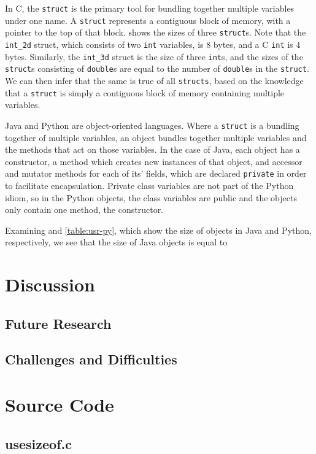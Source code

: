 \documentclass[12pt,letterpaper]{article}
\begin{document}
		In C, the \texttt{struct} is the primary tool for bundling together multiple variables under one name. A \texttt{struct} represents a contiguous block of memory, with a pointer to the top of that block.  shows the sizes of three \texttt{struct}s. Note that the \texttt{int_2d} struct, which consists of two \texttt{int} variables, is 8 bytes, and a C \texttt{int} is 4 bytes. Similarly, the \texttt{int_3d} struct is the size of three \texttt{int}s, and the sizes of the \texttt{struct}s consisting of \texttt{double}s are equal to the number of \texttt{double}s in the \texttt{struct}.  We can then infer that the same is true of all \texttt{structs}, based on the knowledge that a \texttt{struct} is simply a contiguous block of memory containing multiple variables.

		Java and Python are object-oriented languages. Where a \texttt{struct} is a bundling together of multiple variables, an object bundles together multiple variables and the methods that act on those variables. In the case of Java, each object has a constructor, a method which creates new instances of that object, and accessor and mutator methods for each of its' fields, which are declared \texttt{private} in order to facilitate encapsulation. Private class variables are not part of the Python idiom, so in the Python objects, the class variables are public and the objects only contain one method, the constructor. 

		Examining  and \cref{table:usr-py}, which show the size of objects in Java and Python, respectively, we see that the size of Java objects is equal to 

	\section {Discussion}
		\subsection{Future Research}
		\subsection{Challenges and Difficulties}
	\appendix
		\section{Source Code}
			\label{ap:source}
			\subsection{usesizeof.c}
				
\end{document}
